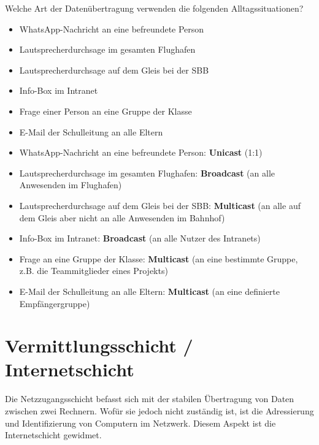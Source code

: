 \begin{myexercise}
	Welche Art der Datenübertragung verwenden die folgenden Alltagssituationen?
	\begin{itemize}
		\item WhatsApp-Nachricht an eine befreundete Person
		\item Lautsprecherdurchsage im gesamten Flughafen
		\item Lautsprecherdurchsage auf dem Gleis bei der SBB
		\item Info-Box im Intranet
		\item Frage einer Person an eine Gruppe der Klasse
		\item E-Mail der Schulleitung an alle Eltern
	\end{itemize}
	\begin{myanswer}
		\begin{itemize}
			\item WhatsApp-Nachricht an eine befreundete Person: \textbf{Unicast} (1:1)
			\item Lautsprecherdurchsage im gesamten Flughafen: \textbf{Broadcast} (an alle Anwesenden im Flughafen)
			\item Lautsprecherdurchsage auf dem Gleis bei der SBB: \textbf{Multicast} (an alle auf dem Gleis aber nicht an alle Anwesenden im Bahnhof)
			\item Info-Box im Intranet: \textbf{Broadcast} (an alle Nutzer des Intranets)
			\item Frage an eine Gruppe der Klasse: \textbf{Multicast} (an eine bestimmte Gruppe, z.B. die Teammitglieder eines Projekts)
			\item E-Mail der Schulleitung an alle Eltern: \textbf{Multicast} (an eine definierte Empfängergruppe)
		\end{itemize}
	\end{myanswer}
\end{myexercise}


\section{\texorpdfstring{\textcolor{\networkLayerColor}{Vermittlungsschicht / Internetschicht}}{Vermittlungsschicht / Internetschicht}}
Die Netzzugangsschicht befasst sich mit der stabilen Übertragung von Daten zwischen zwei Rechnern. Wofür sie jedoch nicht zuständig ist, ist die Adressierung und Identifizierung von Computern im Netzwerk. Diesem Aspekt ist die Internetschicht gewidmet.

